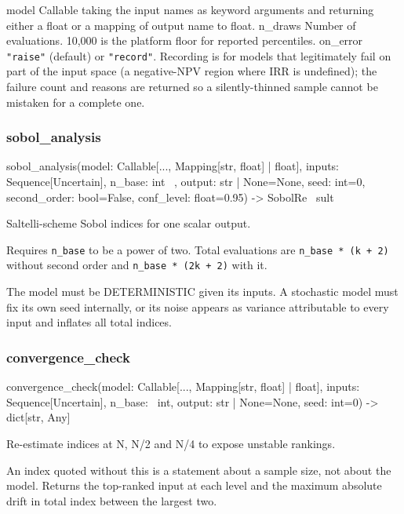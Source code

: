 \documentclass[10pt,a4paper,twoside]{report}
\begin{document}
model Callable taking the input names as keyword arguments and returning either a float or a mapping of output name to float. n\_draws Number of evaluations. 10,000 is the platform floor for reported percentiles. on\_error \texttt{"raise"} (default) or \texttt{"record"}. Recording is for models that legitimately fail on part of the input space (a negative-NPV region where IRR is undefined); the failure count and reasons are returned so a silently-thinned sample cannot be mistaken for a complete one.

\subsubsection*{sobol\_analysis}

\begin{verbatimsmall}
sobol_analysis(model: Callable[..., Mapping[str, float] | float], inputs: Sequence[Uncertain], n_base: int
    \ , output: str | None=None, seed: int=0, second_order: bool=False, conf_level: float=0.95) -> SobolRe
    \ sult
\end{verbatimsmall}

Saltelli-scheme Sobol indices for one scalar output.

Requires \texttt{n\_base} to be a power of two. Total evaluations are \texttt{n\_base * (k + 2)} without second order and \texttt{n\_base * (2k + 2)} with it.

The model must be DETERMINISTIC given its inputs. A stochastic model must fix its own seed internally, or its noise appears as variance attributable to every input and inflates all total indices.

\subsubsection*{convergence\_check}

\begin{verbatimsmall}
convergence_check(model: Callable[..., Mapping[str, float] | float], inputs: Sequence[Uncertain], n_base: 
    \ int, output: str | None=None, seed: int=0) -> dict[str, Any]
\end{verbatimsmall}

Re-estimate indices at N, N/2 and N/4 to expose unstable rankings.

An index quoted without this is a statement about a sample size, not about the model. Returns the top-ranked input at each level and the maximum absolute drift in total index between the largest two.
\end{document}
